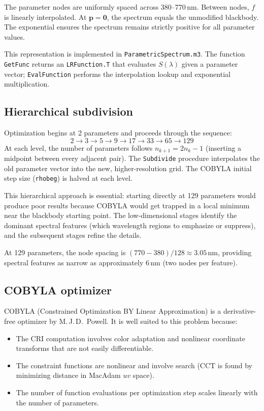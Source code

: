 \documentclass[11pt]{article}
\newcommand{\cmd}[1]{\texttt{#1}}
\newcommand{\file}[1]{\texttt{#1}}
\begin{document}
The parameter nodes are uniformly spaced across 380--770\,nm.  Between
nodes, $f$ is linearly interpolated.  At $\mathbf{p} = \mathbf{0}$,
the spectrum equals the unmodified blackbody.  The exponential ensures
the spectrum remains strictly positive for all parameter values.

This representation is implemented in \file{ParametricSpectrum.m3}.
The function \cmd{GetFunc} returns an \cmd{LRFunction.T} that
evaluates $S(\lambda)$ given a parameter vector; \cmd{EvalFunction}
performs the interpolation lookup and exponential multiplication.

\subsection{Hierarchical subdivision}

Optimization begins at 2 parameters and proceeds through the sequence:
\[
  2 \to 3 \to 5 \to 9 \to 17 \to 33 \to 65 \to 129
\]
At each level, the number of parameters follows $n_{k+1} = 2n_k - 1$
(inserting a midpoint between every adjacent pair).  The
\cmd{Subdivide} procedure interpolates the old parameter vector into
the new, higher-resolution grid.  The COBYLA initial step size
(\cmd{rhobeg}) is halved at each level.

This hierarchical approach is essential: starting directly at 129
parameters would produce poor results because COBYLA would get trapped
in a local minimum near the blackbody starting point.  The
low-dimensional stages identify the dominant spectral features (which
wavelength regions to emphasize or suppress), and the subsequent stages
refine the details.

At 129 parameters, the node spacing is $(770 - 380) / 128 \approx 3.05$\,nm,
providing spectral features as narrow as approximately 6\,nm (two nodes
per feature).

\subsection{COBYLA optimizer}

COBYLA (Constrained Optimization BY Linear Approximation) is a
derivative-free optimizer by M.\,J.\,D.\ Powell.  It is well suited to
this problem because:
\begin{itemize}
  \item The CRI computation involves color adaptation and nonlinear
    coordinate transforms that are not easily differentiable.
  \item The constraint functions are nonlinear and involve search
    (CCT is found by minimizing distance in MacAdam $uv$ space).
  \item The number of function evaluations per optimization step scales
    linearly with the number of parameters.
\end{itemize}
\end{document}
